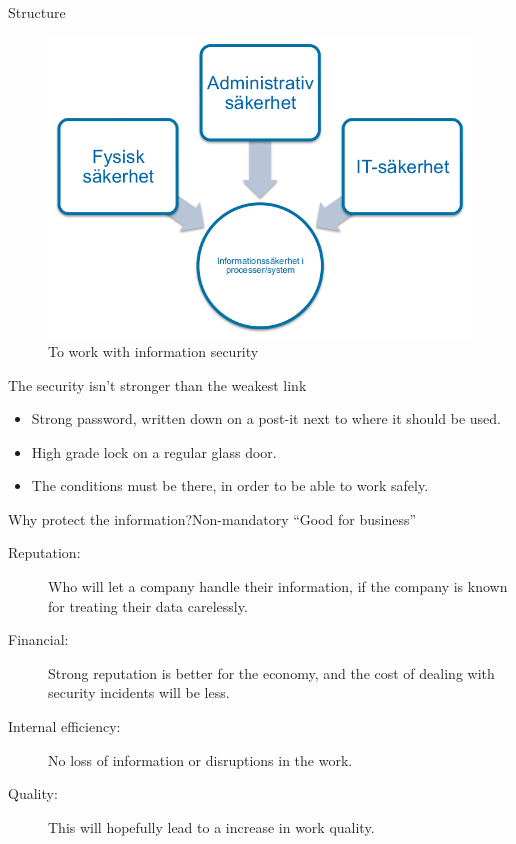 \documentclass{beamer}
\begin{document}
\begin{frame}{Structure}
  \begin{figure}
    \includegraphics[height=0.7\textheight]{Figures/infosak-process.png}
    \caption{To work with information security}
  \end{figure}
\end{frame}

\begin{frame}{The security isn't stronger than the weakest link}
  \begin{itemize}
    \item Strong password, written down on a post-it next to where it should be
      used.
    \item High grade lock on a regular glass door.
    \item The conditions must be there, in order to be able to work safely.
  \end{itemize}
\end{frame}

\begin{frame}{Why protect the information?}{Non-mandatory}
  \enquote{Good for business}
  \begin{description}
    \item[Reputation:] Who will let a company handle their information, if the
      company is known for treating their data carelessly.
    \item[Financial:] Strong reputation is better for the economy, and the cost
      of dealing with security incidents will be less.
    \item[Internal efficiency:] No loss of information or disruptions in the
      work.
    \item[Quality:] This will hopefully lead to a increase in work quality.
  \end{description}
\end{frame}
\end{document}
